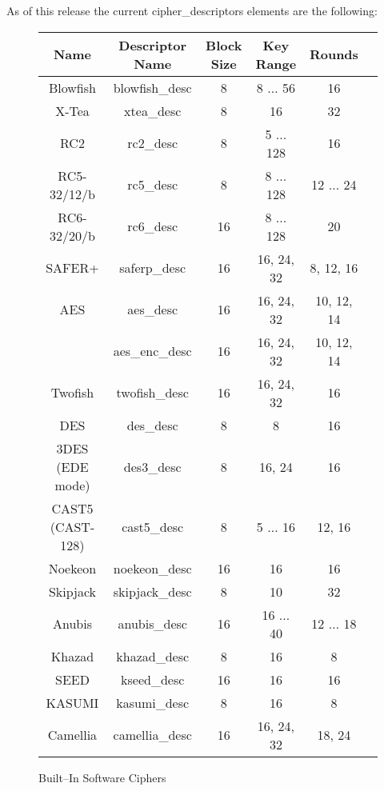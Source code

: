 \documentclass[synpaper]{book}
\begin{document}
As of this release the current cipher\_descriptors elements are the following:
\vfil
{}
       
         
\begin{figure}[hpbt]
\begin{small}
\begin{center}
\begin{tabular}{|c|c|c|c|c|c|}
     \hline \textbf{Name} & \textbf{Descriptor Name} & \textbf{Block Size} & \textbf{Key Range} & \textbf{Rounds} \\
     \hline Blowfish & blowfish\_desc & 8 & 8 $\ldots$ 56 & 16 \\
     \hline X-Tea & xtea\_desc & 8 & 16 & 32 \\
     \hline RC2 & rc2\_desc & 8 & 5 $\ldots$ 128 & 16 \\
     \hline RC5-32/12/b & rc5\_desc & 8 & 8 $\ldots$ 128 & 12 $\ldots$ 24 \\
     \hline RC6-32/20/b & rc6\_desc & 16 & 8 $\ldots$ 128 & 20 \\
     \hline SAFER+ & saferp\_desc &16 & 16, 24, 32 & 8, 12, 16 \\
     \hline AES & aes\_desc & 16 & 16, 24, 32 & 10, 12, 14 \\
                & aes\_enc\_desc & 16 & 16, 24, 32 & 10, 12, 14 \\
     \hline Twofish & twofish\_desc & 16 & 16, 24, 32 & 16 \\
     \hline DES & des\_desc & 8 & 8 & 16 \\
     \hline 3DES (EDE mode) & des3\_desc & 8 & 16, 24 & 16 \\
     \hline CAST5 (CAST-128) & cast5\_desc & 8 & 5 $\ldots$ 16 & 12, 16 \\
     \hline Noekeon & noekeon\_desc & 16 & 16 & 16 \\
     \hline Skipjack & skipjack\_desc & 8 & 10 & 32 \\
     \hline Anubis & anubis\_desc & 16 & 16 $\ldots$ 40 & 12 $\ldots$ 18 \\
     \hline Khazad & khazad\_desc & 8 & 16 & 8 \\
     \hline SEED   & kseed\_desc & 16 & 16 & 16 \\
     \hline KASUMI & kasumi\_desc & 8 & 16 & 8 \\
     \hline Camellia & camellia\_desc & 16 & 16, 24, 32 & 18, 24 \\
     \hline
\end{tabular}
\end{center}
\end{small}
\caption{Built--In Software Ciphers}
\end{figure}
\end{document}
